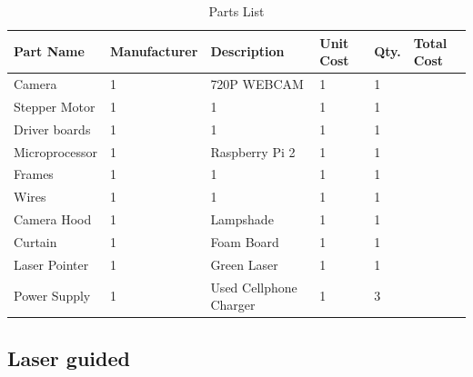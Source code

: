 \documentclass[12pt]{article}
\begin{document}
\begin{flushleft}
\begin{table}[ht!]
	\begin{center}	
		\label{my-label}
		\begin{tabular}{|l|l|l|l|l|l|}
			\hline
			Part Name & Manufacturer & Description  & Unit Cost & Qty. & Total Cost \\ \hline
			Camera & 1 & 720P WEBCAM & 1 &1 & \\ 
			\hline
			Stepper Motor & 1 & 1 & 1 & 1 &\\ 
			\hline
			Driver boards & 1 &  1&  1&1 & \\
			\hline
			Microprocessor & 1 & Raspberry Pi 2 &  1&1 & \\
			\hline
			Frames & 1 &  1&  1&1 & \\
			\hline
			Wires & 1 &  1&  1&1 & \\
			\hline
			Camera Hood & 1 & Lampshade &  1&1 & \\
			\hline
			Curtain & 1 & Foam Board &  1&1 & \\
			\hline
			Laser Pointer & 1 & Green Laser &  1&1 & \\
			\hline
			Power Supply & 1 & Used Cellphone Charger & 1 & 3 & \\
			\hline
		\end{tabular}
		\caption{Parts List}
	\end{center}
\end{table}


\subsection{Laser guided}


\end{flushleft}
\end{document}
